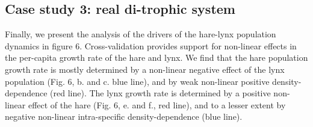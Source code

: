 \documentclass[11pt, oneside]{article}
\begin{document}
\subsection{Case study 3: real di-trophic system}

Finally, we present the analysis of the drivers of the hare-lynx population dynamics in figure 6.
Cross-validation provides support for non-linear effects in the per-capita growth rate of the hare and lynx.
We find that the hare population growth rate is mostly determined by a non-linear negative effect of the lynx population (Fig. 6, b. and c. blue line), and by weak non-linear positive density-dependence (red line). 
The lynx growth rate is determined by a positive non-linear effect of the hare (Fig. 6, e. and f., red line), and to a lesser extent by negative non-linear intra-specific density-dependence (blue line).
\end{document}
